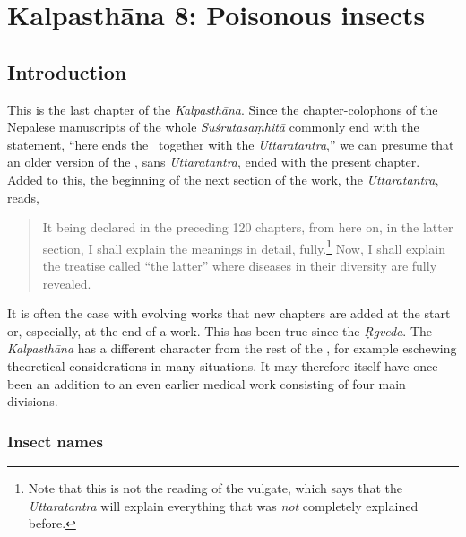 \chapter{Kalpasthāna 8: Poisonous insects}

\section{Introduction} 

This is the last chapter of the \emph{Kalpasthāna}.  Since the
chapter-colophons of the Nepalese manuscripts of the whole
\emph{Suśrutasaṃhitā} commonly end with the statement, “here ends the
\SS\ together with the \emph{Uttaratantra},” we can presume that an older
version of the \SS, sans \emph{Uttaratantra}, ended with the present chapter.
Added to this, the beginning of the next section of the work, the
\emph{Uttaratantra}, reads,
\begin{quote}
It being declared in the preceding 120
chapters, from here on, in the latter section, I shall explain the
meanings in detail, fully.\footnote{Note that this is not the reading
    of the vulgate, which says that the \emph{Uttaratantra} will explain
    everything that was \emph{not} completely explained before.}  Now, I
    shall explain the treatise called “the latter” where diseases
    in their diversity are fully revealed.
    \end{quote}
It is often the case with evolving works that new chapters are added
at the start or, especially, at the end of a work.  This has been true
since the \emph{Ṛgveda}.  The \emph{Kalpasthāna} has a different character
from the rest of the \SS, for example eschewing theoretical
considerations in many situations.  It may therefore itself have once
been an addition to an even earlier medical work consisting of four main
divisions.

\subsection{Insect names}
\label{insectnames}

